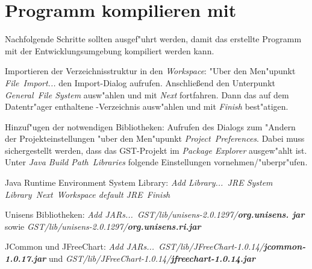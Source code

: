 \chapter{Programm kompilieren mit \eclipse}

Nachfolgende Schritte sollten ausgef"uhrt werden, damit das erstellte Programm mit der Entwicklungsumgebung \eclipse kompiliert werden kann.
\begin{enumerate}
	{%
	\renewcommand{\theenumi}{\arabic{enumi}}
	\renewcommand{\labelenumi}{{\theenumi}.}
	\item Importieren der Verzeichnisstruktur in den \emph{Workspace}:
		  "Uber den Men"upunkt \emph{File\ \chemarrow Import...} den Import-Dialog aufrufen.
		  Anschlie{\ss}end den Unterpunkt \emph{General\ \chemarrow File System} ausw"ahlen und mit \emph{Next} fortfahren.
		  Dann das auf dem Datentr"ager enthaltene \eclipseNS -Verzeichnis ausw"ahlen und mit \emph{Finish} best"atigen.
	\item Hinzuf"ugen der notwendigen Bibliotheken:
		  Aufrufen des Dialogs zum "Andern der Projekteinstellungen "uber den Men"upunkt \emph{Project\ \chemarrow Preferences}.
		  Dabei muss sichergestellt werden, dass das GST-Projekt im \emph{Package Explorer} ausgew"ahlt ist.
		  Unter \emph{Java Build Path\ \chemarrow Libraries} folgende Einstellungen vornehmen/"uberpr"ufen.
		\begin{enumerate}
			{%
			\renewcommand{\theenumii}{\arabic{enumii}}
			\renewcommand{\labelenumii}{{\theenumii}.}
			\item Java Runtime Environment System Library: \emph{Add Library...\ \chemarrow JRE System Library\ \chemarrow Next\ \chemarrow Workspace default JRE\ \chemarrow Finish}
			\item Unisens Bibliotheken: \emph{Add JARs...\ \chemarrow GST/lib/unisens-2.0.1297/\textbf{org.unisens. jar}} sowie \emph{GST/lib/unisens-2.0.1297/\textbf{org.unisens.ri.jar}}
			\item JCommon und JFreeChart: \emph{Add JARs...\ \chemarrow GST/lib/JFreeChart-1.0.14/\textbf{jcom\-mon-1.0.17.jar}} und \emph{GST/lib/JFreeChart-1.0.14/\textbf{jfreechart-1.0.14.jar}}
			}
		\end{enumerate}
	}
\end{enumerate}